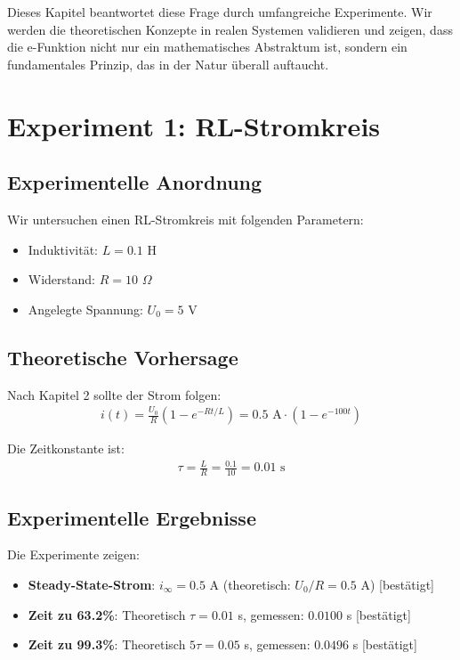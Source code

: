 ﻿\documentclass[a4paper,12pt]{report}
\theoremstyle{definition}
\begin{document}
	Dieses Kapitel beantwortet diese Frage durch umfangreiche Experimente. Wir werden die theoretischen Konzepte in realen Systemen validieren und zeigen, dass die e-Funktion nicht nur ein mathematisches Abstraktum ist, sondern ein fundamentales Prinzip, das in der Natur überall auftaucht.
	
	\section{Experiment 1: RL-Stromkreis}
	
	\subsection{Experimentelle Anordnung}
	
	Wir untersuchen einen RL-Stromkreis mit folgenden Parametern:
	\begin{itemize}
		\item[-] Induktivität: $L = 0.1$ H
		\item[-] Widerstand: $R = 10$ $\Omega$
		\item[-] Angelegte Spannung: $U_0 = 5$ V
	\end{itemize}
	
	\subsection{Theoretische Vorhersage}
	
	Nach Kapitel 2 sollte der Strom folgen:
	\begin{align}
		i(t) = \frac{U_0}{R} (1 - e^{-Rt/L}) = 0.5 \text{ A} \cdot (1 - e^{-100t})
	\end{align}
	
	Die Zeitkonstante ist:
	\begin{align}
		\tau = \frac{L}{R} = \frac{0.1}{10} = 0.01 \text{ s}
	\end{align}
	
	\subsection{Experimentelle Ergebnisse}
	
	Die Experimente zeigen:
	\begin{itemize}
		\item[-] \textbf{Steady-State-Strom}: $i_{\infty} = 0.5$ A (theoretisch: $U_0/R = 0.5$ A) [bestätigt]
		\item[-] \textbf{Zeit zu 63.2\%}: Theoretisch $\tau = 0.01$ s, gemessen: $0.0100$ s [bestätigt]
		\item[-] \textbf{Zeit zu 99.3\%}: Theoretisch $5\tau = 0.05$ s, gemessen: $0.0496$ s [bestätigt]
	\end{itemize}
	
\end{document}
